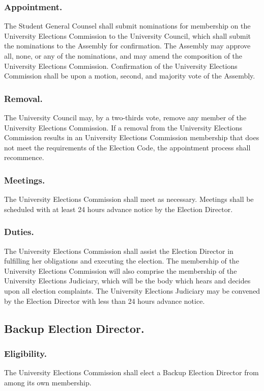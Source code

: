 \subsubsection{Appointment.}
The Student General Counsel shall submit nominations for membership on the University Elections Commission to the University Council, which shall submit the nominations to the Assembly for confirmation.  The Assembly may approve all, none, or any of the nominations, and may amend the composition of the University Elections Commission.  Confirmation of the University Elections Commission shall be upon a motion, second, and majority vote of the Assembly.

\subsubsection{Removal.}
The University Council may, by a two-thirds vote, remove any member of the University Elections Commission.  If a removal from the University Elections Commission results in an University Elections Commission membership that does not meet the requirements of the Election Code, the appointment process shall recommence.

\subsubsection{Meetings.}
The University Elections Commission shall meet as necessary.  Meetings shall be scheduled with at least 24 hours advance notice by the Election Director.

\subsubsection{Duties.}
\subsubsubsection{}
The University Elections Commission shall assist the Election Director in fulfilling her obligations and executing the election.
\subsubsubsection{}
The membership of the University Elections Commission will also comprise the membership of the University Elections Judiciary, which will be the body which hears and decides upon all election complaints.  The University Elections Judiciary may be convened by the Election Director with less than 24 hours advance notice.

\subsection{Backup Election Director.}

\subsubsection{Eligibility.}
The University Elections Commission shall elect a Backup Election Director from among its own membership.
